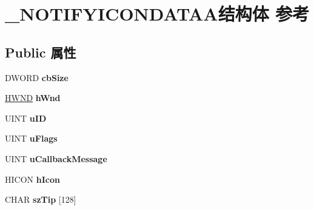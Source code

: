\hypertarget{struct___n_o_t_i_f_y_i_c_o_n_d_a_t_a_a}{}\section{\+\_\+\+N\+O\+T\+I\+F\+Y\+I\+C\+O\+N\+D\+A\+T\+A\+A结构体 参考}
\label{struct___n_o_t_i_f_y_i_c_o_n_d_a_t_a_a}
\subsection*{Public 属性}
\begin{DoxyCompactItemize}
\item 
\mbox{\label{struct___n_o_t_i_f_y_i_c_o_n_d_a_t_a_a_a225d661791de63dae34707c803215f57}} 
D\+W\+O\+RD {\bfseries cb\+Size}
\item 
\mbox{\label{struct___n_o_t_i_f_y_i_c_o_n_d_a_t_a_a_a7b11d00d17b81c09df284f149ee0852f}} 
\hyperlink{interfacevoid}{H\+W\+ND} {\bfseries h\+Wnd}
\item 
\mbox{\label{struct___n_o_t_i_f_y_i_c_o_n_d_a_t_a_a_af1ccfbda6fb1110f07682714c6b78e52}} 
U\+I\+NT {\bfseries u\+ID}
\item 
\mbox{\label{struct___n_o_t_i_f_y_i_c_o_n_d_a_t_a_a_a05c2a3ec2bbc15efa01da484dcb53397}} 
U\+I\+NT {\bfseries u\+Flags}
\item 
\mbox{\label{struct___n_o_t_i_f_y_i_c_o_n_d_a_t_a_a_a5b776a58252c4c93ea262ee8b819ad9c}} 
U\+I\+NT {\bfseries u\+Callback\+Message}
\item 
\mbox{\label{struct___n_o_t_i_f_y_i_c_o_n_d_a_t_a_a_a9ca4418f708e37f0d12c4d219490a757}} 
H\+I\+C\+ON {\bfseries h\+Icon}
\item 
\mbox{\label{struct___n_o_t_i_f_y_i_c_o_n_d_a_t_a_a_ac66cb6bcdfadb4d4e96feb906b0c7134}} 
C\+H\+AR {\bfseries sz\+Tip} \mbox{[}128\mbox{]}
\item 
\mbox{\label{struct___n_o_t_i_f_y_i_c_o_n_d_a_t_a_a_a17a9c8cada95f21fa7efc2eb36284133}} 

\end{DoxyCompactItemize}
